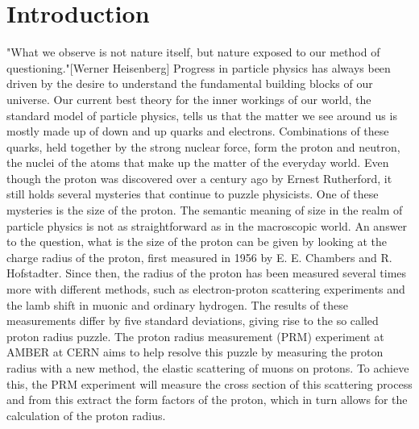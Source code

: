 \chapter{Introduction} \label{chap:introduction}
"What we observe is not nature itself, but nature exposed to our method of questioning."[Werner Heisenberg]\autocite{Heisenberg1958}
\newline
Progress in particle physics has always been driven by the desire to understand the fundamental building blocks of our universe.
\newline Our current best theory for the inner workings of our world,
the standard model of particle physics, tells us that the matter we see around us is mostly made up of down and up quarks and electrons.
Combinations of these quarks, held together by the strong nuclear force, form the proton and neutron, the nuclei of the atoms that make up the matter of the everyday world.\autocite{Workman:2836514}
Even though the proton was discovered over a century ago by Ernest Rutherford\autocite{discoveryProton}, it still holds several mysteries that continue to puzzle physicists.
One of these mysteries is the size of the proton.
\newline
The semantic meaning of size in the realm of particle physics is not as straightforward as in the macroscopic world. An answer to the question,
what is the size of the proton can be given by looking at the charge radius of the proton, first measured in 1956 by E. E. Chambers and R. Hofstadter.\autocite{Hofstadter1956}
\newline
Since then, the radius of the proton has been measured several times more with different methods, such as electron-proton scattering experiments and the lamb shift in muonic and ordinary hydrogen.
The results of these measurements differ by five standard deviations, giving rise to the so called proton radius puzzle.\autocite{ProposalAmber}
\newline
The proton radius measurement (PRM) experiment at AMBER at CERN aims to help resolve this puzzle by measuring the proton radius with a new method,
 the elastic scattering of muons on protons.
\newline
To achieve this, the PRM experiment will measure the cross section of this scattering process and from this extract the form factors of the proton, which in turn allows for the calculation of the proton radius.
